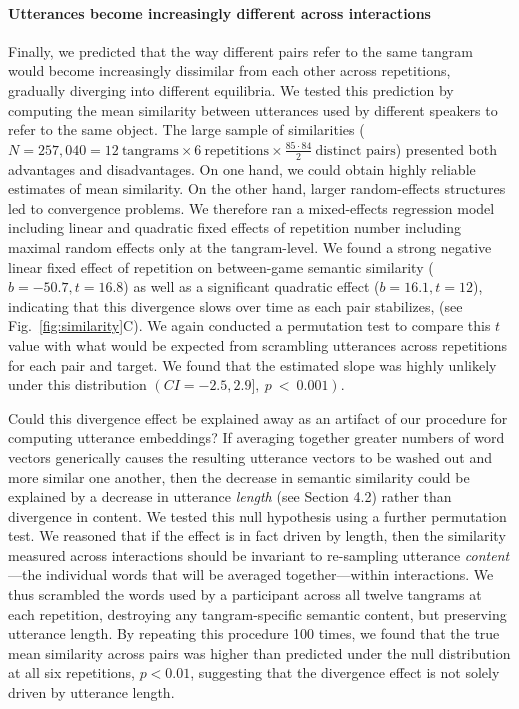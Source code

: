 \documentclass[alpha-refs]{wiley-article}
\begin{document}
\paragraph{Utterances become increasingly different across interactions}
Finally, we predicted that the way different pairs refer to the same tangram would become increasingly dissimilar from each other across repetitions, gradually diverging into different equilibria.
We tested this prediction by computing the mean similarity between utterances used by different speakers to refer to the same object.
The large sample of similarities ($N = 257,040 = 12~\textrm{tangrams} \times 6~\textrm{repetitions} \times \frac{85 \cdot 84}{2}~\textrm{distinct pairs}$) presented both advantages and disadvantages.
On one hand, we could obtain highly reliable estimates of mean similarity. 
On the other hand, larger random-effects structures led to convergence problems.
We therefore ran a mixed-effects regression model including linear and quadratic fixed effects of repetition number including maximal random effects only at the tangram-level. 
We found a strong negative linear fixed effect of repetition on between-game semantic similarity ($b = -50.7, t= 16.8$) as well as a significant quadratic effect ($b= 16.1, t = 12$), indicating that this divergence slows over time as each pair stabilizes, (see Fig.~\ref{fig:similarity}C).
We again conducted a permutation test to compare this $t$ value with what would be expected from scrambling utterances across repetitions for each pair and target.
We found that the estimated slope was highly unlikely under this distribution $(CI = -2.5, 2.9],~p~<~0.001)$. 

Could this divergence effect be explained away as an artifact of our procedure for computing utterance embeddings?
If averaging together greater numbers of word vectors generically causes the resulting utterance vectors to be washed out and more similar one another, then the decrease in semantic similarity could be explained by a decrease in utterance \emph{length} (see Section 4.2) rather than divergence in content.
We tested this null hypothesis using a further  permutation test. 
We reasoned that if the effect is in fact driven by length, then the similarity measured across interactions should be invariant to re-sampling utterance \emph{content}---the individual words that will be averaged together---within interactions.
We thus scrambled the words used by a participant across all twelve tangrams at each repetition, destroying any tangram-specific semantic content, but preserving utterance length.
By repeating this procedure 100 times, we found that the true mean similarity across pairs was higher than predicted under the null distribution at all six repetitions, $p < 0.01$, suggesting that the divergence effect is not solely driven by utterance length.
\end{document}
